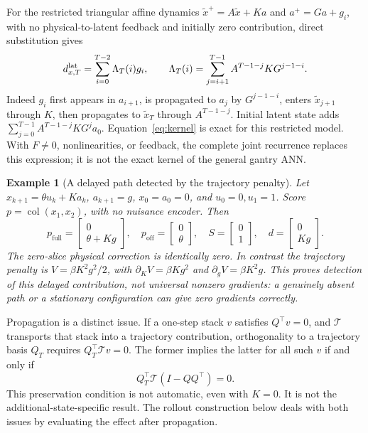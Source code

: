 \documentclass[11pt,a4paper]{article}
\newcommand{\col}{\operatorname{col}}
\newcommand{\full}{\mathrm{full}}
\newcommand{\off}{\mathrm{off}}
\newtheorem{example}[proposition]{Example}
\theoremstyle{remark}
\begin{document}
For the restricted triangular affine dynamics $\tilde x^+=A\tilde x+Ka$ and $a^+=Ga+g_i$, with no physical-to-latent feedback and initially zero contribution, direct substitution gives
\begin{equation}\label{eq:kernel}
 d_{x,T}^{\rm lat}=\sum_{i=0}^{T-2}\Lambda_T(i)g_i,
 \qquad
 \Lambda_T(i)=\sum_{j=i+1}^{T-1}A^{T-1-j}KG^{j-1-i}.
\end{equation}
Indeed $g_i$ first appears in $a_{i+1}$, is propagated to $a_j$ by $G^{j-1-i}$, enters $\tilde x_{j+1}$ through $K$, then propagates to $\tilde x_T$ through $A^{T-1-j}$. Initial latent state adds $\sum_{j=0}^{T-1}A^{T-1-j}KG^j a_0$. Equation~\eqref{eq:kernel} is exact for this restricted model. With $F\ne0$, nonlinearities, or feedback, the complete joint recurrence replaces this expression; it is not the exact kernel of the general gantry ANN.

\begin{example}[A delayed path detected by the trajectory penalty]\label{ex:latent}
Let $x_{k+1}=\theta u_k+Ka_k$, $a_{k+1}=g$, $x_0=a_0=0$, and $u_0=0,u_1=1$. Score $p=\col(x_1,x_2)$, with no nuisance encoder. Then
\[
 p_\full=\begin{bmatrix}0\\\theta+Kg\end{bmatrix},\quad
 p_\off=\begin{bmatrix}0\\\theta\end{bmatrix},\quad
 S=\begin{bmatrix}0\\1\end{bmatrix},\quad
 d=\begin{bmatrix}0\\Kg\end{bmatrix}.
\]
The zero-slice physical correction is identically zero. In contrast the trajectory penalty is $V=\beta K^2g^2/2$, with $\partial_KV=\beta Kg^2$ and $\partial_gV=\beta K^2g$. This proves detection of this delayed contribution, not universal nonzero gradients: a genuinely absent path or a stationary configuration can give zero gradients correctly.
\end{example}

Propagation is a distinct issue. If a one-step stack $v$ satisfies $Q^\top v=0$, and $\mathcal T$ transports that stack into a trajectory contribution, orthogonality to a trajectory basis $Q_T$ requires $Q_T^\top\mathcal T v=0$. The former implies the latter for all such $v$ if and only if
\begin{equation}
 Q_T^\top\mathcal T(I-QQ^\top)=0.
\end{equation}
This preservation condition is not automatic, even with $K=0$. It is not the additional-state-specific result. The rollout construction below deals with both issues by evaluating the effect after propagation.
\end{document}
